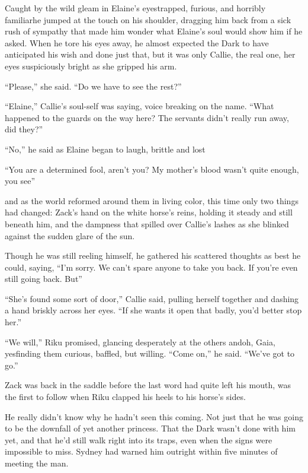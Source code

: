 Caught by the wild gleam in Elaine's eyes\textemdash trapped, furious, and horribly familiar\textemdash he jumped at the touch on his shoulder, dragging him back from a sick rush of sympathy that made him wonder what Elaine's soul would show him if he asked. When he tore his eyes away, he almost expected the Dark to have anticipated his wish and done just that, but it was only Callie, the real one, her eyes suspiciously bright as she gripped his arm. \
\begin{sloppypar}
``Please,'' she said. ``Do we have to see the rest?''

``Elaine,'' Callie's soul-self was saying, voice breaking on the name. ``What happened to the guards on the way here? The servants didn't really run away, did they?''

``No,'' he said as Elaine began to laugh, brittle and lost\textemdash 

``You are a determined fool, aren't you? My mother's blood wasn't quite enough, you see\textemdash ''

\textemdash and as the world reformed around them in living color, this time only two things had changed: Zack's hand on the white horse's reins, holding it steady and still beneath him, and the dampness that spilled over Callie's lashes as she blinked against the sudden glare of the sun.
\end{sloppypar}
Though he was still reeling himself, he gathered his scattered thoughts as best he could, saying, ``I'm sorry. We can't spare anyone to take you back. If you're even still going back. But\textemdash ''

``She's found some sort of door,'' Callie said, pulling herself together and dashing a hand briskly across her eyes. ``If she wants it open that badly, you'd better stop her.''

``We will,'' Riku promised, glancing desperately at the others and\textemdash oh, Gaia, yes\textemdash finding them curious, baffled, but willing. ``Come on,'' he said. ``We've got to go.''

Zack was back in the saddle before the last word had quite left his mouth, was the first to follow when Riku clapped his heels to his horse's sides.

He really didn't know why he hadn't seen this coming. Not just that he was going to be the downfall of yet another princess. That the Dark wasn't done with him yet, and that he'd still walk right into its traps, even when the signs were impossible to miss. Sydney had warned him outright within five minutes of meeting the man.


